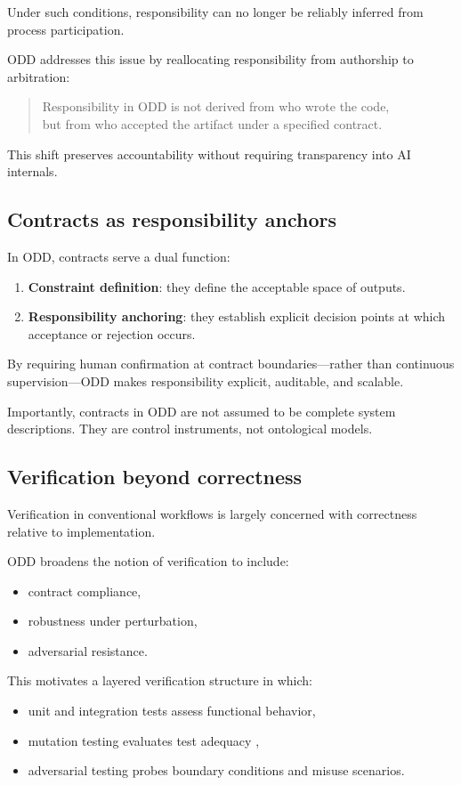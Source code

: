 \documentclass[conference]{IEEEtran}
\begin{document}
Under such conditions, responsibility can no longer be reliably inferred from process participation.

ODD addresses this issue by reallocating responsibility from authorship to arbitration:
\begin{quote}
Responsibility in ODD is not derived from who wrote the code,\\
but from who accepted the artifact under a specified contract.
\end{quote}

This shift preserves accountability without requiring transparency into AI internals.

\subsection{Contracts as responsibility anchors}
In ODD, contracts serve a dual function:
\begin{enumerate}
\item \textbf{Constraint definition}: they define the acceptable space of outputs.
\item \textbf{Responsibility anchoring}: they establish explicit decision points at which acceptance or rejection occurs.
\end{enumerate}

By requiring human confirmation at contract boundaries---rather than continuous supervision---ODD makes responsibility explicit, auditable, and scalable.

Importantly, contracts in ODD are not assumed to be complete system descriptions. They are control instruments, not ontological models.

\subsection{Verification beyond correctness}
Verification in conventional workflows is largely concerned with correctness relative to implementation.

ODD broadens the notion of verification to include:
\begin{itemize}
\item contract compliance,
\item robustness under perturbation,
\item adversarial resistance.
\end{itemize}

This motivates a layered verification structure in which:
\begin{itemize}
\item unit and integration tests assess functional behavior,
\item mutation testing evaluates test adequacy \cite{jia2011mutation, demillo1978testdata},
\item adversarial testing probes boundary conditions and misuse scenarios.
\end{itemize}
\end{document}
